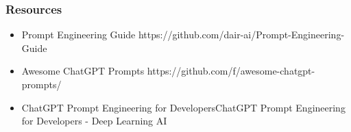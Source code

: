 \begin{frame}[fragile]\frametitle{Resources}
\begin{itemize}
\item Prompt Engineering Guide https://github.com/dair-ai/Prompt-Engineering-Guide
\item Awesome ChatGPT Prompts https://github.com/f/awesome-chatgpt-prompts/
\item ChatGPT Prompt Engineering for DevelopersChatGPT Prompt Engineering for Developers - Deep Learning AI
\end{itemize}	 
\end{frame}


